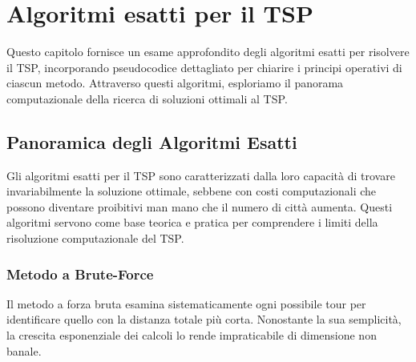 
%

\makeatletter
\newcommand{\ntifpkgloaded}{%
	\@ifpackageloaded%
}
\makeatother

\chapter{Algoritmi esatti per il \Gls{TSP}} \label{chapt:3}

Questo capitolo fornisce un esame approfondito degli algoritmi esatti per risolvere il \Gls{TSP}, incorporando pseudocodice dettagliato per chiarire i principi operativi di ciascun metodo. Attraverso questi algoritmi, esploriamo il panorama computazionale della ricerca di soluzioni ottimali al \Gls{TSP}.

\section{Panoramica degli Algoritmi Esatti}

Gli algoritmi esatti per il \Gls{TSP} sono caratterizzati dalla loro capacità di trovare invariabilmente la soluzione ottimale, sebbene con costi computazionali che possono diventare proibitivi man mano che il numero di città aumenta. Questi algoritmi servono come base teorica e pratica per comprendere i limiti della risoluzione computazionale del \Gls{TSP}.

\subsection{Metodo a Brute-Force}

Il metodo a forza bruta esamina sistematicamente ogni possibile tour per identificare quello con la distanza totale più corta. Nonostante la sua semplicità, la crescita esponenziale dei calcoli lo rende impraticabile di dimensione non banale.

